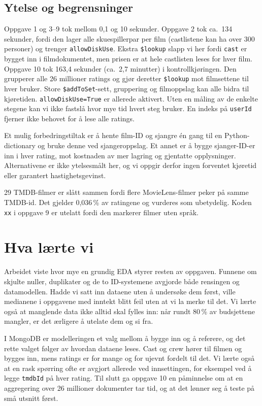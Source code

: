 \documentclass[11pt,a4paper]{article}
\begin{document}
\subsection{Ytelse og begrensninger}
Oppgave 1 og 3--9 tok mellom 0,1 og 10 sekunder. Oppgave 2 tok ca.\ 134 sekunder, fordi den lager alle skuespillerpar per film (castlistene kan ha over 300 personer) og trenger \texttt{allowDiskUse}. Ekstra \texttt{\$lookup} slapp vi her fordi \texttt{cast} er bygget inn i filmdokumentet, men prisen er at hele castlisten leses for hver film. Oppgave 10 tok 163,4 sekunder (ca.\ 2,7 minutter) i kontrollkjøringen. Den grupperer alle 26 millioner ratings og gjør deretter \texttt{\$lookup} mot filmsettene til hver bruker. Store \texttt{\$addToSet}-sett, gruppering og filmoppslag kan alle bidra til kjøretiden. \texttt{allowDiskUse=True} er allerede aktivert. Uten en måling av de enkelte stegene kan vi ikke fastslå hvor mye tid hvert steg bruker. En indeks på \texttt{userId} fjerner ikke behovet for å lese alle ratings.

Et mulig forbedringstiltak er å hente film-ID og sjangre én gang til en Python-dictionary og bruke denne ved sjangeroppslag. Et annet er å bygge sjanger-ID-er inn i hver rating, mot kostnaden av mer lagring og gjentatte opplysninger. Alternativene er ikke ytelsesmålt her, og vi oppgir derfor ingen forventet kjøretid eller garantert hastighetsgevinst.

29 TMDB-filmer er slått sammen fordi flere MovieLens-filmer peker på samme TMDB-id. Det gjelder 0,036\,\% av ratingene og vurderes som ubetydelig. Koden \texttt{xx} i oppgave 9 er utelatt fordi den markerer filmer uten språk.

\section{Hva lærte vi}
Arbeidet viste hvor mye en grundig EDA styrer resten av oppgaven. Funnene om skjulte nuller, duplikater og de to ID-systemene avgjorde både rensingen og datamodellen. Hadde vi satt inn dataene uten å undersøke dem først, ville medianene i oppgavene med inntekt blitt feil uten at vi la merke til det. Vi lærte også at manglende data ikke alltid skal fylles inn: når rundt 80\,\% av budsjettene mangler, er det ærligere å utelate dem og si fra.

I MongoDB er modelleringen et valg mellom å bygge inn og å referere, og det rette valget følger av hvordan dataene leses. Cast og crew hører til filmen og bygges inn, mens ratings er for mange og for ujevnt fordelt til det. Vi lærte også at en rask spørring ofte er avgjort allerede ved innsettingen, for eksempel ved å legge \texttt{tmdbId} på hver rating. Til slutt ga oppgave 10 en påminnelse om at en aggregering over 26 millioner dokumenter tar tid, og at det lønner seg å teste på små utsnitt først.
\end{document}
